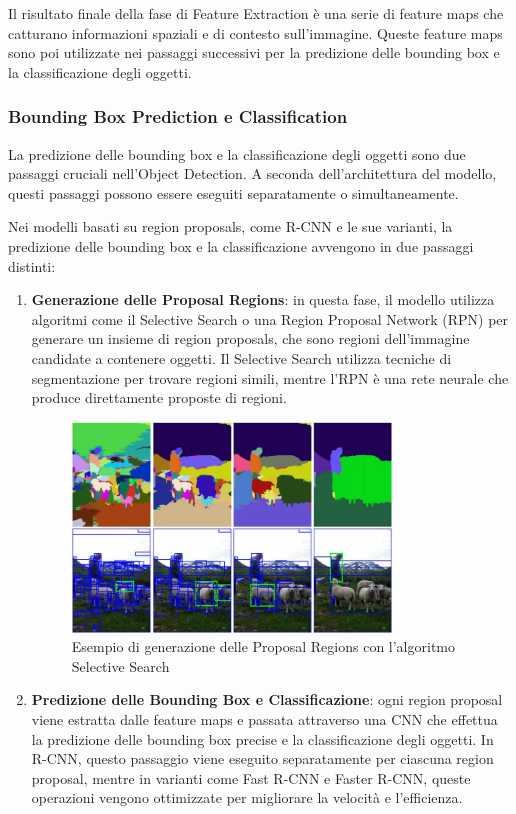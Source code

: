 Il risultato finale della fase di Feature Extraction è una serie di feature maps che catturano informazioni spaziali e di contesto sull'immagine. Queste feature maps sono poi utilizzate nei passaggi successivi per la predizione delle bounding box e la classificazione degli oggetti.

\subsubsection{Bounding Box Prediction e Classification}
La predizione delle bounding box e la classificazione degli oggetti sono due passaggi cruciali nell'Object Detection. A seconda dell'architettura del modello, questi passaggi possono essere eseguiti separatamente o simultaneamente.

Nei modelli basati su region proposals, come R-CNN e le sue varianti, la predizione delle bounding box e la classificazione avvengono in due passaggi distinti:

\begin{enumerate}
  \item \textbf{Generazione delle Proposal Regions}: in questa fase, il modello utilizza algoritmi come il Selective Search o una Region Proposal Network (RPN) per generare un insieme di region proposals, che sono regioni dell'immagine candidate a contenere oggetti. Il Selective Search utilizza tecniche di segmentazione per trovare regioni simili, mentre l'RPN è una rete neurale che produce direttamente proposte di regioni.

\begin{figure}[ht]
    \centering
    \includegraphics[width=0.8\textwidth]{files/capitoli/1-object-detection/assets/selective-search-region-proposals.png}
    \caption{\label{fig:selective-search-region-proposals}Esempio di generazione delle Proposal Regions con l'algoritmo Selective Search\cite{4}}
\end{figure}
  
  \item \textbf{Predizione delle Bounding Box e Classificazione}: ogni region proposal viene estratta dalle feature maps e passata attraverso una CNN che effettua la predizione delle bounding box precise e la classificazione degli oggetti. In R-CNN, questo passaggio viene eseguito separatamente per ciascuna region proposal, mentre in varianti come Fast R-CNN e Faster R-CNN, queste operazioni vengono ottimizzate per migliorare la velocità e l'efficienza.
\end{enumerate}

